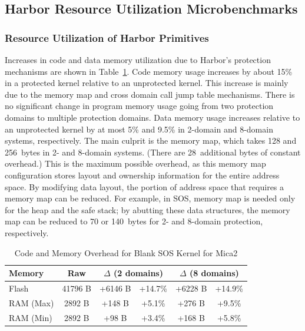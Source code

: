 \subsection{Harbor Resource Utilization Microbenchmarks}
\subsubsection{Resource Utilization of Harbor Primitives}
%
Increases in code and data memory utilization due to Harbor's
protection mechanisms are shown in
Table~\ref{tab:kernel_size_comparison}.
%
Code memory usage increases by about 15\% in a protected kernel
relative to an unprotected kernel.
%
This increase is mainly due to the memory map and cross domain call
jump table mechanisms.
%
There is no significant change in program memory usage going from two
protection domains to multiple protection domains.
%
Data memory usage increases relative to an unprotected kernel by at
most 5\% and 9.5\% in 2-domain and 8-domain systems, respectively.
%
The main culprit is the memory map, which takes 128 and 256~bytes in 2-
and 8-domain systems.  (There are 28~additional bytes of constant
overhead.)
%
This is the maximum possible overhead, as this memory map configuration
stores layout and ownership information for the entire address space.
%
%
By modifying data layout, the portion of address space that requires a
memory map can be reduced.
%
For example, in SOS, memory map is needed only for the heap and the safe
stack; by abutting these data structures, the memory map can be
reduced to 70 or 140~bytes for 2- and 8-domain protection, respectively.
%
%
\begin{table}[htdp]
\centering
\small{\def\X{\hphantom{0}}
\begin{tabular}{|l|c|c|c|c|c|}
	\hline
	Memory & Raw & \multicolumn{2}{c|}{$\Delta$ (2 domains)} & \multicolumn{2}{c|}{$\Delta$ (8 domains)}
	\\
	\hline
	Flash\raise1pt\hbox{\strut}  & 41796 B & +6146 B & +14.7\% & +6228 B & +14.9\% \\
	RAM (Max) & \X{}2892 B & \X{}+148 B & \X{}+5.1\% & \X{}+276 B &
	\X{}+9.5\% \\
	RAM (Min) & \X{}2892 B & \X{}\X{}+98 B & \X{}+3.4\% & \X{}+168 B &
	\X{}+5.8\% \\
	\hline
\end{tabular}}
\caption{Code and Memory Overhead for Blank SOS Kernel for Mica2}
\label{tab:kernel_size_comparison}
\end{table}
